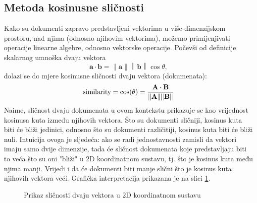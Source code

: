 \documentclass[times, utf8, zavrsni]{fer}
\begin{document}
\subsection{Metoda kosinusne sličnosti}
Kako su dokumenti zapravo predstavljeni vektorima u više-dimenzijskom prostoru, nad njima (odnosno njihovim vektorima), možemo primijenjivati operacije linearne algebre, odnosno vektorske operacije. Počevši od definicije skalarnog umnoška dvaju vektora
\begin{equation}
\mathbf {a} \cdot \mathbf {b} =\left\|\mathbf {a} \right\|\left\|\mathbf {b} \right\|\cos \theta,
\end{equation}
dolazi se do mjere kosinusne sličnosti dvaju vektora (dokumenata):
\begin{equation}
{\text{similarity}}=\cos(\theta )={\mathbf {A} \cdot \mathbf {B}  \over \|\mathbf {A} \|\|\mathbf {B}\|}
\end{equation}
Naime, sličnost dvaju dokumenata u ovom kontekstu prikazuje se kao vrijednost kosinusa kuta između njihovih vektora. Što su dokumenti sličniji, kosinus kuta biti će bliži jedinici, odnosno što su dokumenti različitiji, kosinus kuta biti će bliži nuli. Intuicija ovoga je sljedeća: ako se radi jednostavnosti zamisli da vektori imaju samo dvije dimenzije, tada će sličnost dokumenata koje predstavljaju biti to veća što su oni "bliži" u 2D koordinatnom sustavu, tj. što je kosinus kuta među njima manji. Vrijedi i da će dokumenti biti manje slični što je kosinus kuta njihovih vektora veći. Grafička interpretacija prikazana je na slici \ref{fig:vectors}.

\begin{figure}
\caption{Prikaz sličnosti dvaju vektora u 2D koordinatnom sustavu}
\label{fig:vectors}
\end{figure}
\end{document}
